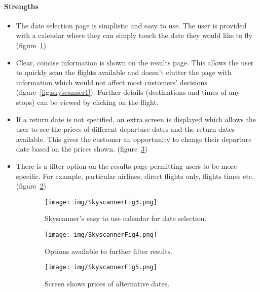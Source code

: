 \paragraph{Strengths}
\begin{itemize}
	\item The date selection page is simplistic and easy to use. The user is
		provided with a calendar where they can simply touch the date they
		would like to fly (figure~\ref{fig:skyscannerfig3})
	\item Clear, concise information is shown on the results page. This allows
		the user to quickly scan the flights available and doesn't clutter the
		page with information which would not affect most customers' decisions
		(figure~\ref{fig:skyscanner1}). Further details (destinations and times
		of any stops) can be viewed by clicking on the flight.
	\item If a return date is not specified, an extra screen is displayed which
		allows the user to see the prices of different departure dates and the
		return dates available. This gives the customer an opportunity to
		change their departure date based on the prices shown.
		(figure~\ref{fig:skyscannerfig5})
	\item There is a filter option on the results page permitting users to be
		more specific. For example, particular airlines, direct flights only,
		flights times etc. (figure~\ref{fig:skyscannerfig4})
\end{itemize}
\begin{figure}[ht]
	\centering
	\begin{subfigure}[b]{0.2\textwidth}
		\texttt{[image: img/SkyscannerFig3.png]}
		\caption{Skyscanner's easy to use calendar for date selection.
		}\label{fig:skyscannerfig3}
	\end{subfigure}
	\qquad
	\begin{subfigure}[b]{0.2\textwidth}
		\texttt{[image: img/SkyscannerFig4.png]}
		\caption{Options available to further filter results.
		}\label{fig:skyscannerfig4}
	\end{subfigure}
	\qquad
	\begin{subfigure}[b]{0.2\textwidth}
		\texttt{[image: img/SkyscannerFig5.png]}
		\caption{Screen shows prices of alternative dates.
		}\label{fig:skyscannerfig5}
	\end{subfigure}
	\caption{}\label{fig:skyscanner2}
\end{figure}

